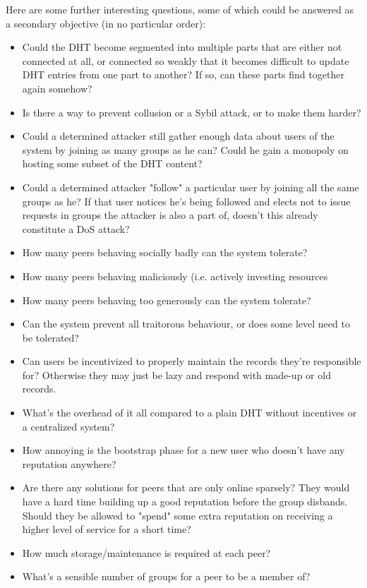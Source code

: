 \documentclass[10pt]{article}
\begin{document}
Here are some further interesting questions, some of which could be answered as
a secondary objective (in no particular order):
\begin{itemize}
\item Could the DHT become segmented into multiple parts that are either not
      connected at all, or connected so weakly that it becomes difficult to
      update DHT entries from one part to another? If so, can these parts find
      together again somehow?
\item Is there a way to prevent collusion or a Sybil attack, or to make them
      harder?
\item Could a determined attacker still gather enough data about users of the
      system by joining as many groups as he can? Could he gain a monopoly on
      hosting some subset of the DHT content?
\item Could a determined attacker "follow" a particular user by joining all the
      same groups as he? If that user notices he's being followed and elects not
      to issue requests in groups the attacker is also a part of, doesn't this
      already constitute a DoS attack?
\item How many peers behaving socially badly can the system tolerate?
\item How many peers behaving maliciously (i.e. actively investing resources
\item How many peers behaving too generously can the system tolerate?
\item Can the system prevent all traitorous behaviour, or does some level need
      to be tolerated?
\item Can users be incentivized to properly maintain the records they're
      responsible for? Otherwise they may just be lazy and respond with made-up
      or old records.
\item What's the overhead of it all compared to a plain DHT without incentives
      or a centralized system?
\item How annoying is the bootstrap phase for a new user who doesn't have any
      reputation anywhere?
\item Are there any solutions for peers that are only online sparsely? They
      would have a hard time building up a good reputation before the group
      disbands. Should they be allowed to "spend" some extra reputation on
      receiving a higher level of service for a short time?
\item How much storage/maintenance is required at each peer?
\item What's a sensible number of groups for a peer to be a member of?

\end{itemize}
\end{document}
